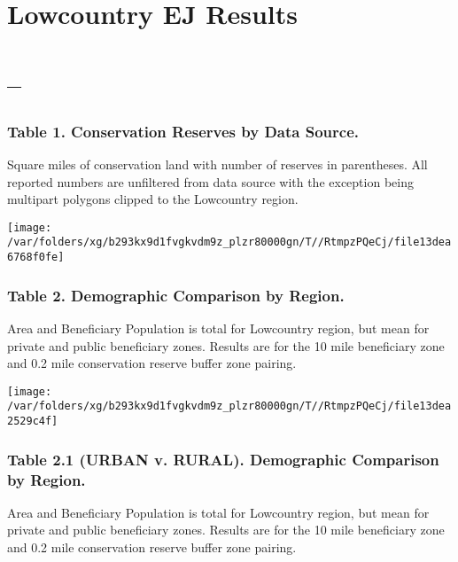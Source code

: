 \documentclass[landscape]{article}
\author{}
\date{\vspace{-2.5em}}
\begin{document}
\hypertarget{lowcountry-ej-results}{%
\section{Lowcountry EJ Results}\label{lowcountry-ej-results}}

\hypertarget{section}{%
\section{--}\label{section}}

\hypertarget{table-1.-conservation-reserves-by-data-source.}{%
\subsubsection{Table 1. Conservation Reserves by Data
Source.}\label{table-1.-conservation-reserves-by-data-source.}}

Square miles of conservation land with number of reserves in
parentheses. All reported numbers are unfiltered from data source with
the exception being multipart polygons clipped to the Lowcountry region.

\texttt{[image: /var/folders/xg/b293kx9d1fvgkvdm9z\_plzr80000gn/T//RtmpzPQeCj/file13dea6768f0fe]}

\hypertarget{table-2.-demographic-comparison-by-region.}{%
\subsubsection{Table 2. Demographic Comparison by
Region.}\label{table-2.-demographic-comparison-by-region.}}

Area and Beneficiary Population is total for Lowcountry region, but mean
for private and public beneficiary zones. Results are for the 10 mile
beneficiary zone and 0.2 mile conservation reserve buffer zone pairing.

\texttt{[image: /var/folders/xg/b293kx9d1fvgkvdm9z\_plzr80000gn/T//RtmpzPQeCj/file13dea2529c4f]}
\pagebreak

\hypertarget{table-2.1-urban-v.-rural.-demographic-comparison-by-region.}{%
\subsubsection{Table 2.1 (URBAN v. RURAL). Demographic Comparison by
Region.}\label{table-2.1-urban-v.-rural.-demographic-comparison-by-region.}}

Area and Beneficiary Population is total for Lowcountry region, but mean
for private and public beneficiary zones. Results are for the 10 mile
beneficiary zone and 0.2 mile conservation reserve buffer zone pairing.
\end{document}
